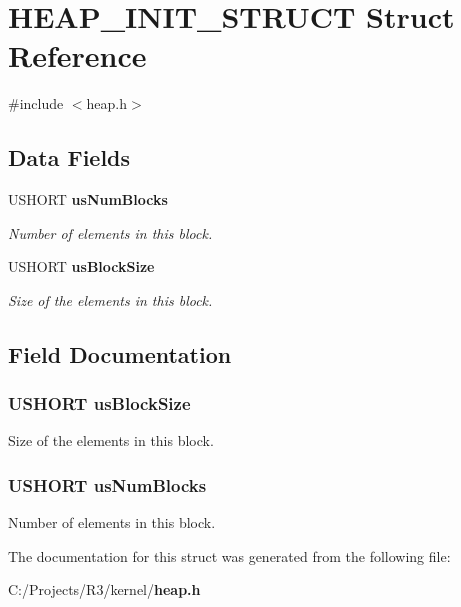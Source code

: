 \section{HEAP\_\-INIT\_\-STRUCT Struct Reference}
\label{struct_h_e_a_p___i_n_i_t___s_t_r_u_c_t}


{\ttfamily \#include $<$heap.h$>$}\subsection*{Data Fields}
\begin{DoxyCompactItemize}
\item 
USHORT {\bf usNumBlocks}
\begin{DoxyCompactList}\small\item\em Number of elements in this block. \item\end{DoxyCompactList}\item 
USHORT {\bf usBlockSize}
\begin{DoxyCompactList}\small\item\em Size of the elements in this block. \item\end{DoxyCompactList}\end{DoxyCompactItemize}


\subsection{Field Documentation}
\subsubsection[{usBlockSize}]{\setlength{\rightskip}{0pt plus 5cm}USHORT {\bf usBlockSize}}\label{struct_h_e_a_p___i_n_i_t___s_t_r_u_c_t_af9582bcf9d38b4465433bca1b7fda760}


Size of the elements in this block. 
\subsubsection[{usNumBlocks}]{\setlength{\rightskip}{0pt plus 5cm}USHORT {\bf usNumBlocks}}\label{struct_h_e_a_p___i_n_i_t___s_t_r_u_c_t_a3b20c65d0fd7b9790e6a3d1d0ca63cf2}


Number of elements in this block. 

The documentation for this struct was generated from the following file:\begin{DoxyCompactItemize}
\item 
C:/Projects/R3/kernel/{\bf heap.h}\end{DoxyCompactItemize}
